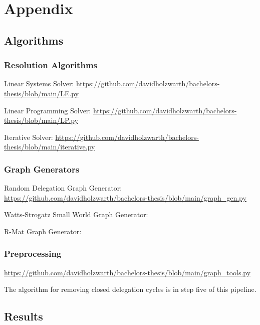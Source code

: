
\chapter{Appendix}

\section{Algorithms}

\subsection{Resolution Algorithms}
\label{an:resolution_algorithms}

Linear Systems Solver: \url{https://github.com/davidholzwarth/bachelors-thesis/blob/main/LE.py}

Linear Programming Solver: \url{https://github.com/davidholzwarth/bachelors-thesis/blob/main/LP.py}

Iterative Solver: \url{https://github.com/davidholzwarth/bachelors-thesis/blob/main/iterative.py}

\subsection{Graph Generators}
\label{an:graph_generators}

Random Delegation Graph Generator: \url{https://github.com/davidholzwarth/bachelors-thesis/blob/main/graph_gen.py}

Watts-Strogatz Small World Graph Generator: 

R-Mat Graph Generator: 

\subsection{Preprocessing}
\label{an:preprocessing}

\url{https://github.com/davidholzwarth/bachelors-thesis/blob/main/graph_tools.py}

The algorithm for removing closed delegation cycles is in step five of this pipeline.


\section{Results}

